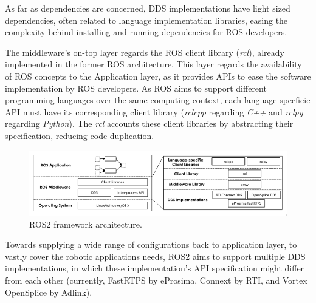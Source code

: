 As far as dependencies are concerned, DDS implementations have light sized dependencies, often related to language implementation libraries, easing the complexity behind installing and running dependencies for ROS developers. \cite{ros-on-dds}

The middleware's on-top layer regards the ROS client library (\textit{rcl}), already implemented in the former ROS architecture. This layer regards the availability of ROS concepts to the Application layer, as it provides APIs to ease the software implementation by ROS developers. \cite{ros2documentation} As ROS aims to support different programming languages over the same computing context, each language-specficic API must have its corresponding client library (\textit{rclcpp} regarding \textit{C++} and \textit{rclpy} regarding \textit{Python}). The \textit{rcl} accounts these client libraries by abstracting their specification, reducing code duplication.   
\cite{rcl, casini2019response}


\begin{figure}[H]
    \centering
    \includegraphics[width=\linewidth]{images/ros2-architecture.png}
    \caption{ROS2 framework architecture.}
    \label{fig:ros2-architecture}
\end{figure}

Towards supplying a wide range of configurations back to application layer, to vastly cover the robotic applications needs, ROS2 aims to support multiple DDS implementations, in which these implementation's API specification might differ from each other (currently, FastRTPS by eProsima, Connext by RTI, and Vortex OpenSplice by Adlink). 

